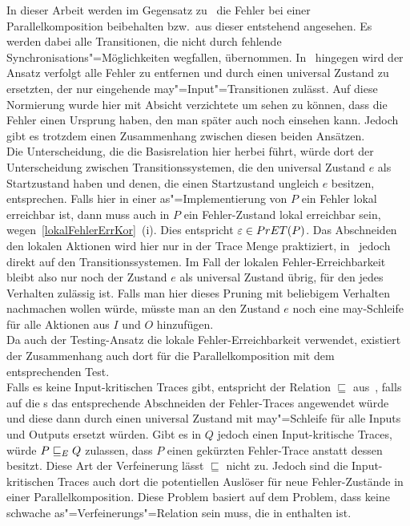 In dieser Arbeit werden im Gegensatz zu~\cite{Vogler2016MIA3} die Fehler bei
einer Parallelkomposition beibehalten bzw.\ aus dieser entstehend angesehen. Es
werden dabei alle Transitionen, die nicht durch fehlende
Synchronisations"=Möglichkeiten wegfallen, übernommen. In~\cite{Vogler2016MIA3}
hingegen wird der Ansatz verfolgt alle Fehler zu entfernen und durch einen
universal Zustand zu ersetzten, der nur eingehende may"=Input"=Transitionen
zulässt. Auf diese Normierung wurde hier mit Absicht verzichtete um sehen zu
können, dass die Fehler einen Ursprung haben, den man später auch noch einsehen
kann. Jedoch gibt es trotzdem einen Zusammenhang zwischen diesen beiden
Ansätzen.\\
Die Unterscheidung, die die Basisrelation \EBRel{} hier herbei führt, würde
dort der Unterscheidung zwischen Transitionssystemen, die den universal
Zustand $e$ als Startzustand haben und denen, die einen Startzustand ungleich
$e$ besitzen, entsprechen. Falls hier in einer as"=Implementierung von $P$ ein
Fehler lokal erreichbar ist, dann muss auch in $P$ ein Fehler-Zustand lokal
erreichbar sein, wegen~\ref{lokalFehlerErrKor}~(i). Dies entspricht
$\varepsilon \in PrET (P)$. Das Abschneiden den lokalen Aktionen wird hier nur
in der Trace Menge praktiziert, in~\cite{Vogler2016MIA3} jedoch direkt auf den
Transitionssystemen. Im Fall der lokalen Fehler-Erreichbarkeit bleibt also
nur noch der Zustand $e$ als universal Zustand übrig, für den jedes Verhalten
zulässig ist. Falls man hier dieses Pruning mit beliebigem Verhalten nachmachen
wollen würde, müsste man an den Zustand $e$ noch eine may-Schleife für alle
Aktionen aus $I$ und $O$ hinzufügen.\\
Da auch der Testing-Ansatz die lokale Fehler-Erreichbarkeit verwendet,
existiert der Zusammenhang auch dort für die Parallelkomposition mit dem
entsprechenden Test.\\
Falls es keine Input-kritischen Traces gibt, entspricht \ERel{} der Relation
$\sqsubseteq$ aus~\cite{Vogler2016MIA3}, falls auf die \MEIO{}s das
entsprechende Abschneiden der Fehler-Traces angewendet würde und diese dann
durch einen universal Zustand mit may"=Schleife für alle Inputs und Outputs
ersetzt würden. Gibt es in $Q$ jedoch einen Input-kritische Traces, würde $P
 \sqsubseteq  _E Q$ zulassen, dass $P$ einen gekürzten Fehler-Trace anstatt dessen
besitzt. Diese Art der Verfeinerung lässt $\sqsubseteq$ nicht zu. Jedoch sind
die Input-kritischen Traces auch dort die potentiellen Auslöser für neue
Fehler-Zustände in einer Parallelkomposition. Diese Problem basiert auf dem
Problem, dass \ERel{} keine schwache as"=Verfeinerungs"=Relation sein muss, die
in \wasRel{} enthalten ist.
